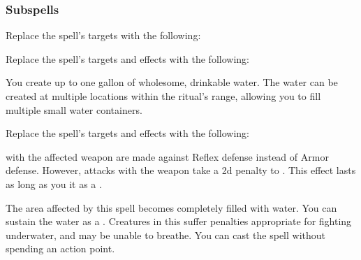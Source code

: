 \subsubsection{Subspells}
Replace the spell's targets with the following:
\begin{spellcontent}
\begin{augmenttargetinginfo}
\end{augmenttargetinginfo}
\end{spellcontent}
Replace the spell's targets and effects with the following:
\begin{spellcontent}
\begin{augmenttargetinginfo}
\spellrng{\rngclose}
\end{augmenttargetinginfo}
\begin{augmenteffects}
\spelleffect
You create up to one gallon of wholesome, drinkable water.
The water can be created at multiple locations within the ritual's range, allowing you to fill multiple small water containers.
\end{augmenteffects}
\end{spellcontent}
Replace the spell's targets and effects with the following:
\begin{spellcontent}
\begin{augmenttargetinginfo}
\end{augmenttargetinginfo}
\begin{augmenteffects}
\spelleffect
{} with the affected weapon are made against Reflex defense instead of Armor defense.
However, attacks with the weapon take a \minus2d penalty to .
This effect lasts as long as you  it as a .
\end{augmenteffects}
\end{spellcontent}
The area affected by this spell becomes completely filled with water.
You can sustain the water as a .
Creatures in this  suffer penalties appropriate for fighting underwater, and may be unable to breathe.
You can cast the spell without spending an action point.

